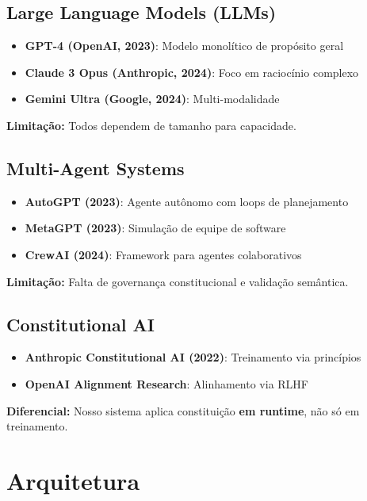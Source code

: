 \documentclass[11pt]{article}
\begin{document}
\subsection{Large Language Models (LLMs)}

\begin{itemize}
    \item \textbf{GPT-4 (OpenAI, 2023)}: Modelo monolítico de propósito geral
    \item \textbf{Claude 3 Opus (Anthropic, 2024)}: Foco em raciocínio complexo
    \item \textbf{Gemini Ultra (Google, 2024)}: Multi-modalidade
\end{itemize}

\textbf{Limitação:} Todos dependem de tamanho para capacidade.

\subsection{Multi-Agent Systems}

\begin{itemize}
    \item \textbf{AutoGPT (2023)}: Agente autônomo com loops de planejamento
    \item \textbf{MetaGPT (2023)}: Simulação de equipe de software
    \item \textbf{CrewAI (2024)}: Framework para agentes colaborativos
\end{itemize}

\textbf{Limitação:} Falta de governança constitucional e validação semântica.

\subsection{Constitutional AI}

\begin{itemize}
    \item \textbf{Anthropic Constitutional AI (2022)}: Treinamento via princípios
    \item \textbf{OpenAI Alignment Research}: Alinhamento via RLHF
\end{itemize}

\textbf{Diferencial:} Nosso sistema aplica constituição \textbf{em runtime}, não só em treinamento.

\section{Arquitetura}
\end{document}
